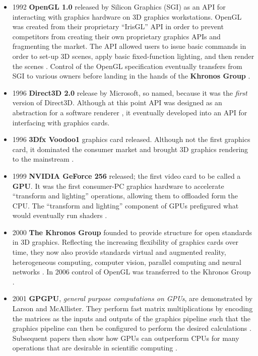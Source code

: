 \documentclass[a4paper,12pt,twoside,openright]{report}
\begin{document}
\begin{itemize}

    \item 1992 \textbf{OpenGL 1.0} released by Silicon Graphics (SGI) as an API
    for interacting with graphics hardware on 3D graphics workstations. OpenGL
    was created from their proprietary ``IrisGL'' API in order to prevent
    competitors from creating their own proprietary graphics APIs and
    fragmenting the market. The API allowed users to issue basic commands in
    order to set-up 3D scenes, apply basic fixed-function lighting, and then
    render the scenes \cite{OpenGL_1_0}. Control of the OpenGL specification
    eventually transfers from SGI to various owners before landing in the hands
    of the \textbf{Khronos Group} \cite{OpenGL}.

    \item 1996 \textbf{Direct3D 2.0} release by Microsoft, so named, because it
    was the \textit{first} version of Direct3D. Although at this point API was
    designed as an abstraction for a software renderer
    \cite{JohnCarmackPlanDirect3DvsOpenGl}, it eventually developed into an API
    for interfacing with graphics cards.

    \item 1996 \textbf{3Dfx Voodoo1} graphics card released. Although not the
    first graphics card, it dominated the consumer market and brought 3D
    graphics rendering to the mainstream \cite{Voodoo1}.

    \item 1999 \textbf{NVIDIA GeForce 256} released; the first video card to be
    called a \textbf{GPU}. It was the first consumer-PC graphics hardware to
    accelerate ``transform and lighting'' operations, allowing them to
    offloaded form the CPU. The ``transform and lighting'' component of GPUs
    prefigured what would eventually run shaders \cite{GeForce256}.

    \item 2000 \textbf{The Khronos Group} founded to provide structure for open
    standards in 3D graphics. Reflecting the increasing flexibility of graphics
    cards over time, they now also provide standards virtual and augmented
    reality, heterogeneous computing, computer vision, parallel computing and
    neural networks \cite{KhronosGroupAbout}. In 2006 control of OpenGL was
    transferred to the Khronos Group \cite{OpenGLToKhronos}.

    \item 2001 \textbf{GPGPU}, \textit{general purpose computations on GPUs},
    are demonstrated by Larson and McAllister. They perform fast matrix
    multiplications by encoding the matrices as the inputs and outputs of the
    graphics pipeline such that the graphics pipeline can then be configured to
    perform the desired calculations \cite{MatrixGPU}. Subsequent papers then
    show how GPUs can outperform CPUs for many operations that are desirable in
    scientific computing \cite{CUDAtoOpenCL} \cite{Kruger03linearalgebra}
    \cite{LUGPU} \cite{SparsematrixGPU}.


\end{itemize}
\end{document}
